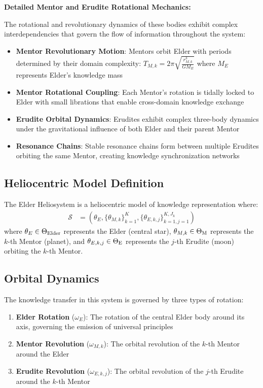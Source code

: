 \textbf{Detailed Mentor and Erudite Rotational Mechanics:}

The rotational and revolutionary dynamics of these bodies exhibit complex interdependencies that govern the flow of information throughout the system:

\begin{itemize}
    \item \textbf{Mentor Revolutionary Motion}: Mentors orbit Elder with periods determined by their domain complexity: $T_{M,k} = 2\pi\sqrt{\frac{r_{M,k}^3}{GM_E}}$ where $M_E$ represents Elder's knowledge mass
    \item \textbf{Mentor Rotational Coupling}: Each Mentor's rotation is tidally locked to Elder with small librations that enable cross-domain knowledge exchange
    \item \textbf{Erudite Orbital Dynamics}: Erudites exhibit complex three-body dynamics under the gravitational influence of both Elder and their parent Mentor
    \item \textbf{Resonance Chains}: Stable resonance chains form between multiple Erudites orbiting the same Mentor, creating knowledge synchronization networks
\end{itemize}

\subsection{Heliocentric Model Definition}

\begin{definition}
The Elder Heliosystem is a heliocentric model of knowledge representation where:
\begin{align}
\mathcal{S} &= (\theta_E, \{\theta_{M,k}\}_{k=1}^K, \{\theta_{E,k,j}\}_{k=1,j=1}^{K,J_k})
\end{align}
where $\theta_E \in \Theta_{\text{Elder}}$ represents the Elder (central star), $\theta_{M,k} \in \Theta_{\text{M}}$ represents the $k$-th Mentor (planet), and $\theta_{E,k,j} \in \Theta_{\text{E}}$ represents the $j$-th Erudite (moon) orbiting the $k$-th Mentor.
\end{definition}

\subsection{Orbital Dynamics}

The knowledge transfer in this system is governed by three types of rotation:

\begin{enumerate}
    \item \textbf{Elder Rotation} ($\omega_E$): The rotation of the central Elder body around its axis, governing the emission of universal principles
    \item \textbf{Mentor Revolution} ($\omega_{M,k}$): The orbital revolution of the $k$-th Mentor around the Elder
    \item \textbf{Erudite Revolution} ($\omega_{E,k,j}$): The orbital revolution of the $j$-th Erudite around the $k$-th Mentor
\end{enumerate}

